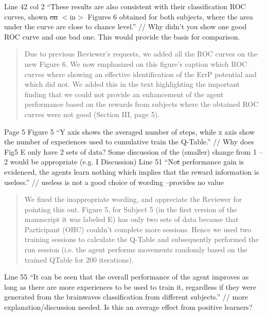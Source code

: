 \documentclass[journal,onecolumn,12pt]{IEEEtran}
\begin{document}
Line 42 col 2 “These results are also consistent with their classification ROC curves, shown \sout{on} $<$in$>$ Figures 6 obtained for both subjects, where the area under the curve are close to chance level.” // Why didn’t you show one good ROC curve and one bad one. This would provide the basis for comparison.

\begin{quotation}
{\color{blue}
Due to previous Reviewer's requests, we added all the ROC curves on the new Figure 6.  We now emphasized on this figure's caption which ROC curves where showing an effective identification of the ErrP potential and which did not.  We added this in the text highlighting the important finding that we could not provide an enhancement of the agent performance based on the rewards from subjects where the obtained ROC curves were not good (Section III, page 5).
}
\end{quotation}

Page 5
Figure 5 “Y axis shows the averaged number of steps, while x axis show the number of
experiences used to cumulative train the Q-Table.”
// Why does Fig5 E only have 2 sets of data? Some discussion of the (smaller) change from 1 – 2 would be appropriate (e.g. I Discussion)
Line 51 “No\sout{t} performance gain is evidenced, the agents learn nothing which implies that the reward information is useless.” // useless is not a good choice of wording –provides no value

\begin{quotation}
{\color{blue}
We fixed the inappropriate wording, and appreciate the Reviewer for pointing this out.  
Figure 5, for Subject 5 (in the first version of the manuscript it was labeled E) has only two sets of data because that Participant (OHC) couldn't complete more sessions.  Hence we used two training sessions to calculate the Q-Table and subsequently performed the run session (i.e. the agent performs movements randomly based on the trained QTable for 200 iterations).
}
\end{quotation}

Line 55 “It can be seen that the overall performance of the agent improves as long as there are more experiences to be used to train it, regardless if they were generated from the brainwaves classification from different subjects.” // more explanation/discussion needed. Is this an average effect from positive learners?
\end{document}
